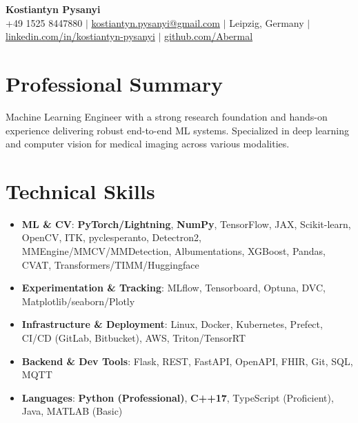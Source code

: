 \documentclass[letterpaper,10pt]{article}
\newcommand{\resumeItem}[1]{
    \item\small{#1}\vspace{-0.5pt}
}
\newcommand{\resumeSubHeadingList}{\begin{itemize}[leftmargin=0.15in, label={}]\vspace{-2pt}}
\newcommand{\resumeSubHeadingListEnd}{\end{itemize}}
\begin{document}
\begin{center}
  \textbf{\Huge Kostiantyn Pysanyi}\vspace{4pt} \\
  \small +49 1525 8447880 $|$ \href{mailto:kostiantyn.pysanyi@gmail.com}{kostiantyn.pysanyi@gmail.com} $|$ Leipzig, Germany $|$
  \href{https://www.linkedin.com/in/kostiantyn-pysanyi/}{linkedin.com/in/kostiantyn-pysanyi} $|$ \href{https://github.com/Abermal}{github.com/Abermal}
\end{center}




\section{Professional Summary}
Machine Learning Engineer with a strong research foundation and hands-on experience delivering robust end-to-end ML systems. Specialized in deep learning and computer vision for medical imaging across various modalities.

\section{Technical Skills}
\resumeSubHeadingList
  \resumeItem{\textbf{ML \& CV}: \textbf{PyTorch/Lightning}, \textbf{NumPy}, TensorFlow, JAX, Scikit-learn, OpenCV, ITK, pyclesperanto, Detectron2, MMEngine/MMCV/MMDetection, Albumentations, XGBoost, Pandas, CVAT, Transformers/TIMM/Huggingface}
  \resumeItem{\textbf{Experimentation \& Tracking}: MLflow, Tensorboard, Optuna, DVC, Matplotlib/seaborn/Plotly}
  \resumeItem{\textbf{Infrastructure \& Deployment}: Linux, Docker, Kubernetes, Prefect, CI/CD (GitLab, Bitbucket), AWS, Triton/TensorRT}
  \resumeItem{\textbf{Backend \& Dev Tools}: Flask, REST, FastAPI, OpenAPI, FHIR, Git, SQL, MQTT}
  \resumeItem{\textbf{Languages}: \textbf{Python (Professional)}, \textbf{C++17}, TypeScript (Proficient), Java, MATLAB (Basic)}
\resumeSubHeadingListEnd
\end{document}
